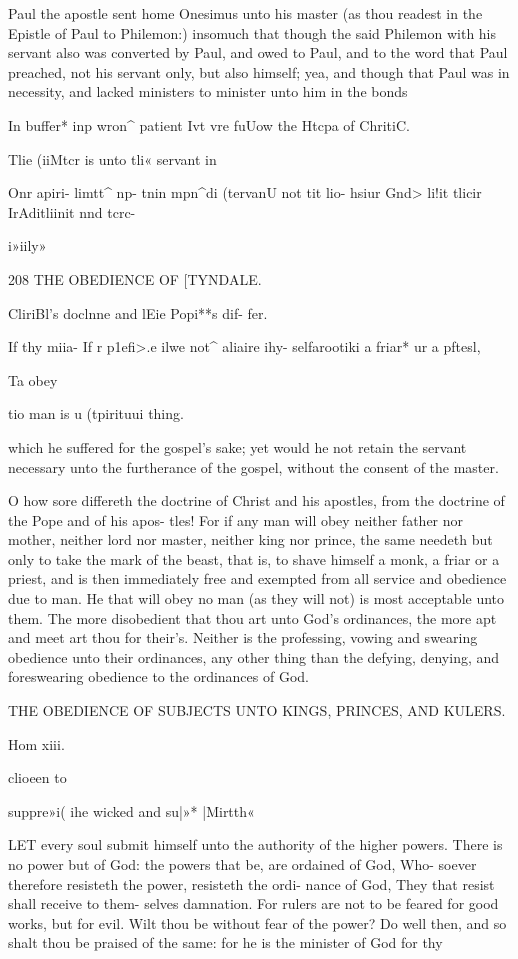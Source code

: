 \documentclass{custom}
\begin{document}
Paul the apostle sent home Onesimus unto his master 
(as thou readest in the Epistle of Paul to Philemon:) 
insomuch that though the said Philemon with his servant 
also was converted by Paul, and owed to Paul, and 
to the word that Paul preached, not his servant only, but 
also himself; yea, and though that Paul was in necessity, 
and lacked ministers to minister unto him in the bonds 

In buffer* 
inp wron^ 
patient Ivt 
vre fuUow 
the Htcpa 
of ChritiC. 

Tlie (iiMtcr 
is unto tli« 
servant in 

Onr apiri- 
limtt^ np- 
tnin mpn^di 
(tervanU 
not tit lio- 
hsiur Gnd> 
li!it tlicir 
IrAditliinit 
nnd tcrc- 

i»iily» 


208 
THE OBEDIENCE OF 
[TYNDALE.

CliriBl's 
doclnne 
and lEie 
Popi**s dif- 
fer. 

If thy miia- 
If r p1efi>.e 
ilwe not^ 
aliaire ihy- 
selfarootiki 
a friar* ur a 
pftesl, 

Ta obey 

tio man is 
u (tpirituui 
thing. 

which he suffered for the gospel's sake; yet would he not 
retain the servant necessary unto the furtherance of the 
gospel, without the consent of the master.

O how sore differeth the doctrine of Christ and his 
apostles, from the doctrine of the Pope and of his apos-
tles! For if any man will obey neither father nor 
mother, neither lord nor master, neither king nor prince, 
the same needeth but only to take the mark of the beast, 
that is, to shave himself a monk, a friar or a priest, and is 
then immediately free and exempted from all service and 
obedience due to man. He that will obey no man (as 
they will not) is most acceptable unto them. The more 
disobedient that thou art unto God's ordinances, the more 
apt and meet art thou for their's. Neither is the professing, 
vowing and swearing obedience unto their ordinances, any 
other thing than the defying, denying, and foreswearing 
obedience to the ordinances of God.

THE OBEDIENCE OF SUBJECTS UNTO KINGS, 
PRINCES, AND KULERS. 

Hom xiii. 

clioeen to 

suppre»i( 
ihe wicked 
and su|»* 
|Mirtth« 

LET every soul submit himself unto the authority of 
the higher powers. There is no power but of 
God: the powers that be, are ordained of God, Who- 
soever therefore resisteth the power, resisteth the ordi- 
nance of God, They that resist shall receive to them- 
selves damnation. For rulers are not to be feared for 
good works, but for evil. Wilt thou be without fear of 
the power? Do well then, and so shalt thou be praised 
of the same: for he is the minister of God for thy
\end{document}
